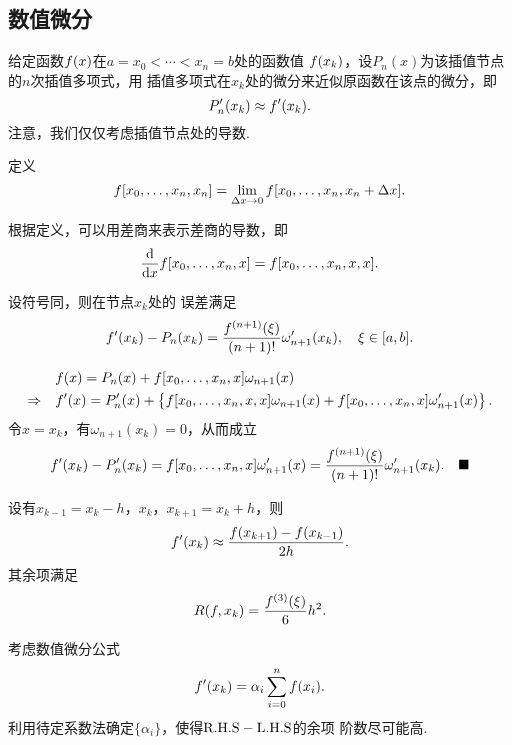 \subsection{数值微分}
  \begin{defi}[插值型数值微分]
    \label{defi: 插值型数值微分}
    给定函数$\mathnormal{f}(x)$在$a=x_0 < \cdots < x_n = b$处的函数值
    $\mathnormal{f}(x_k)$，设$P_n(x)$为该插值节点的$n$次插值多项式，用
    插值多项式在$x_k$处的微分来近似原函数在该点的微分，即
    \[
      P_n^\prime(x_k) \approx \mathnormal{f}^\prime(x_k).
    \]
    注意，我们仅仅考虑插值节点处的导数.
  \end{defi}

  \begin{defi}[含重节点的差商]
    定义
    \[
      \mathnormal{f}[x_0,\dots,x_n,x_n] = \lim_{\Delta x\to0}
      \mathnormal{f}[x_0,\dots,x_n,x_n+\Delta x].
    \]
  \end{defi}
  \remark
    根据定义，可以用差商来表示差商的导数，即
    \[
      \frac{\mathrm{d}}{\mathrm{d} x}\mathnormal{f}[x_0,\dots,x_n,x]
      = \mathnormal{f}[x_0, \dots, x_n, x, x].
    \]

  \begin{thm}[插值型数值微分的误差]
    设符号同，则在节点$x_k$处的
    误差满足
    \[
      \mathnormal{f}^\prime(x_k) - P_n(x_k) = \frac{\mathnormal{f}^{(n+1)}(\xi)}{(n+1)!}
      \omega^\prime_{n+1}(x_k),\quad \xi\in[a, b].
    \]
  \end{thm}
  \proof
    \[\begin{split}
      &\mathnormal{f}(x) = P_n(x) + \mathnormal{f}[x_0,\dots,x_n,x]\omega_{n+1}(x)\\
      \Rightarrow\quad&
      \mathnormal{f}^\prime(x) = P^\prime_n(x) + \left\{
        \mathnormal{f}[x_0,\dots,x_n,x,x]\omega_{n+1}(x)
        + \mathnormal{f}[x_0,\dots,x_n,x]\omega^\prime_{n+1}(x)
      \right\}.
    \end{split}\]
    令$x=x_k$，有$\omega_{n+1}(x_k) = 0$，从而成立
    \[
      \mathnormal{f}^\prime(x_k)-P_n^\prime(x_k) = \mathnormal{f}[x_0,\dots,x_n,x]\omega^\prime_{n+1}(x)
      = \frac{\mathnormal{f}^{(n+1)}(\xi)}{(n+1)!}\omega_{n+1}^\prime(x_k).
      \quad\blacksquare
    \]

  \begin{cor}[中点方法]
    设有$x_{k-1} = x_k - h$，$x_k$，$x_{k+1}=x_k+h$，则
    \[
      \mathnormal{f}^\prime(x_k) \approx \frac{\mathnormal{f}(x_{k+1}) - \mathnormal{f}(x_{k-1})}{2h}.
    \]
    其余项满足
    \[
      R(\mathnormal{f}, x_k) = \frac{\mathnormal{f}^{(3)}(\xi)}{6}h^2.
    \]
  \end{cor}

  \begin{pos}[待定系数法]
    考虑数值微分公式
    \[
      \mathnormal{f}^\prime(x_k) = \alpha_i\sum_{i=0}^n\mathnormal{f}(x_i).
    \]
    利用待定系数法确定$\{\alpha_i\}$，使得$\text{R.H.S}-\text{L.H.S}$的余项
    阶数尽可能高.
  \end{pos}

